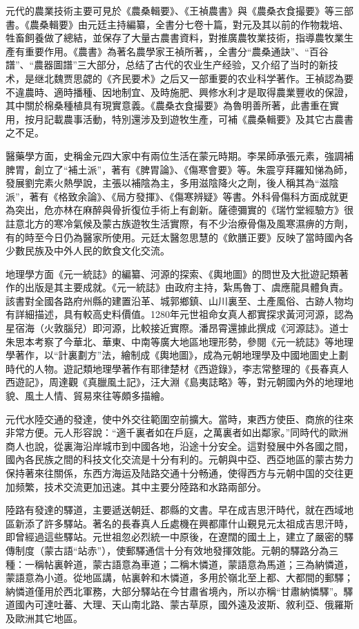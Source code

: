 元代的農業技術主要可見於《農桑輯要》、《王禎農書》與《農桑衣食撮要》等三部書。《農桑輯要》由元廷主持編纂，全書分七卷十篇，對元及其以前的作物栽培、牲畜飼養做了總結，並保存了大量古農書資料，對推廣農牧業技術，指導農牧業生產有重要作用。《農書》為著名農學家王禎所著，，全書分“農桑通訣”、“百谷譜”、“農器圖譜”三大部分，总结了古代的农业生产经验，又介绍了当时的新技术，是继北魏贾思勰的《齐民要术》之后又一部重要的农业科学著作。王禎認為要不違農時、適時播種、因地制宜、及時施肥、興修水利才是取得農業豐收的保證，其中關於棉桑種植具有現實意義。《農桑衣食撮要》為魯明善所著，此書重在實用，按月記載農事活動，特別還涉及到遊牧生產，可補《農桑輯要》及其它古農書之不足。

醫藥學方面，史稱金元四大家中有兩位生活在蒙元時期。李杲師承張元素，強調補脾胃，創立了“補土派”，著有《脾胃論》、《傷寒會要》等。朱震亨拜羅知悌為師，發展劉完素火熱學說，主張以補陰為主，多用滋陰降火之劑，後人稱其為“滋陰派”，著有《格致余論》、《局方發揮》、《傷寒辨疑》等書。外科骨傷科方面成就更為突出，危亦林在麻醉與骨折復位手術上有創新。薩德彌實的《瑞竹堂經驗方》很註意北方的寒冷氣候及蒙古族遊牧生活實際，有不少治療骨傷及風寒濕痹的方劑，有的時至今日仍為醫家所使用。元廷太醫忽思慧的《飲膳正要》反映了當時國內各少數民族及中外人民的飲食文化交流。

地理學方面《元一統誌》的編纂、河源的探索、《輿地圖》的問世及大批遊記類著作的出版是其主要成就。《元一統誌》由政府主持，紮馬魯丁、虞應龍具體負責。該書對全國各路府州縣的建置沿革、城郭鄉鎮、山川裏至、土產風俗、古跡人物均有詳細描述，具有較高史料價值。1280年元世祖命女真人都實探求黃河河源，認為星宿海（火敦腦兒）即河源，比較接近實際。潘昂霄還據此撰成《河源誌》。道士朱思本考察了今華北、華東、中南等廣大地區地理形勢，參閱《元一統誌》等地理學著作，以“計裏劃方”法，繪制成《輿地圖》，成為元朝地理學及中國地圖史上劃時代的人物。遊記類地理學著作有耶律楚材《西遊錄》，李志常整理的《長春真人西遊記》，周達觀《真臘風土記》，汪大淵《島夷誌略》等，對元朝國內外的地理地貌、風土人情、貿易來往等頗多描繪。

元代水陸交通的發達，使中外交往範圍空前擴大。當時，東西方使臣、商旅的往來非常方便。元人形容說：“適千裏者如在戶庭，之萬裏者如出鄰家。”同時代的歐洲商人也說，從裏海沿岸城市到中國各地，沿途十分安全。這對發展中外各國之間，國內各民族之間的科技文化交流是十分有利的。元朝與中亞、西亞地區的蒙古势力保持著來往關係，东西方海运及陆路交通十分畅通，使得西方与元朝中国的交往更加频繁，技术交流更加迅速。其中主要分陸路和水路兩部分。

陸路有發達的驛道，主要遞送朝廷、郡縣的文書。早在成吉思汗時代，就在西域地區新添了許多驛站。著名的長春真人丘處機在興都庫什山覲見元太祖成吉思汗時，即曾經過這些驛站。元世祖忽必烈統一中原後，在遼闊的國土上，建立了嚴密的驛傳制度（蒙古語“站赤”），使郵驛通信十分有效地發揮效能。元朝的驛路分為三種：一稱帖裏幹道，蒙古語意為車道；二稱木憐道，蒙語意為馬道；三為納憐道，蒙語意為小道。從地區講，帖裏幹和木憐道，多用於嶺北至上都、大都間的郵驛；納憐道僅用於西北軍務，大部分驛站在今甘肅省境內，所以亦稱“甘肅納憐驛”。驛道國內可達吐蕃、大理、天山南北路、蒙古草原，國外遠及波斯、敘利亞、俄羅斯及歐洲其它地區。

